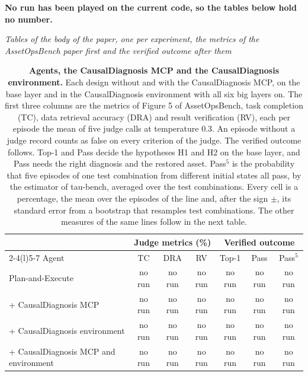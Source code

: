 \documentclass[10pt]{article}
\begin{document}
\begin{center}\small\textbf{No run has been played on the current code, so the tables below hold no number.}\end{center}
\vspace{-8pt}
\begin{center}\footnotesize\textit{Tables of the body of the paper, one per experiment, the metrics of the AssetOpsBench paper first and the verified outcome after them}\end{center}
\vspace{-10pt}
\begin{table}[H]\centering\footnotesize
\caption{\textbf{Agents, the CausalDiagnosis MCP and the CausalDiagnosis environment.} Each design without and with the CausalDiagnosis MCP, on the base layer and in the CausalDiagnosis environment with all six big layers on. The first three columns are the metrics of Figure 5 of AssetOpsBench, task completion (TC), data retrieval accuracy (DRA) and result verification (RV), each per episode the mean of five judge calls at temperature 0.3. An episode without a judge record counts as false on every criterion of the judge. The verified outcome follows. Top-1 and Pass decide the hypotheses H1 and H2 on the base layer, and Pass needs the right diagnosis and the restored asset. Pass$^{5}$ is the probability that five episodes of one test combination from different initial states all pass, by the estimator of tau-bench, averaged over the test combinations. Every cell is a percentage, the mean over the episodes of the line and, after the sign $\pm$, its standard error from a bootstrap that resamples test combinations. The other measures of the same lines follow in the next table.}
\label{tab:agents}
\setlength{\tabcolsep}{3pt}
\begin{tabular}{lcccccc}
\toprule
 & \multicolumn{3}{c}{Judge metrics (\%)} & \multicolumn{3}{c}{Verified outcome} \\
\cmidrule(lr){2-4}\cmidrule(l){5-7}
Agent & TC & DRA & RV & Top-1 & Pass & Pass$^{5}$ \\
\midrule
Plan-and-Execute & no run & no run & no run & no run & no run & no run \\
\quad + CausalDiagnosis MCP & no run & no run & no run & no run & no run & no run \\
\quad + CausalDiagnosis environment & no run & no run & no run & no run & no run & no run \\
\quad + CausalDiagnosis MCP and environment & no run & no run & no run & no run & no run & no run \\

\end{tabular}
\end{table}
\end{document}
